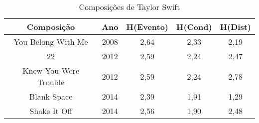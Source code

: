 \begin{table}[]
\centering
\caption{Composições de Taylor Swift}
\label{tab:taylor}
\begin{tabular}{|c|c|c|c|c|}
\hline
\rowcolor[HTML]{9B9B9B} 
{\color[HTML]{FFFFFF} Composição} & {\color[HTML]{FFFFFF} Ano} & {\color[HTML]{FFFFFF} H(Evento)} & {\color[HTML]{FFFFFF} H(Cond)} & {\color[HTML]{FFFFFF} H(Dist)} \\ \hline
You Belong With Me                & 2008                       & 2,64                             & 2,33                           & 2,19                           \\ \hline
22                                & 2012                       & 2,59                             & 2,24                           & 2,47                           \\ \hline
Knew You Were Trouble             & 2012                       & 2,59                             & 2,24                           & 2,78                           \\ \hline
Blank Space                       & 2014                       & 2,39                             & 1,91                           & 1,29                           \\ \hline
Shake It Off                      & 2014                       & 2,56                             & 1,90                           & 2,48                           \\ \hline
\end{tabular}
\end{table}